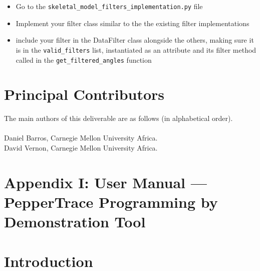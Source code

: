 \documentclass{CSSRforAfrica}
\newcommand{\blank}{~\\}
\begin{document}
\begin{itemize}[left=0em,  labelsep=1em, listparindent=1em] %
    \item Go to the \texttt{skeletal\_model\_filters\_implementation.py} file
    \item Implement your filter class similar to the the existing filter implementations
    \item include your filter in the DataFilter class alongside the others, making sure it is in the \texttt{valid\_filters} list, instantiated as an attribute and its filter method called in the \texttt{get\_filtered\_angles} function
\end{itemize}


\newpage




\pagebreak
\section*{Principal Contributors}
\label{contributors}
The main authors of this deliverable are as follows (in alphabetical order).
\blank
~
\blank
Daniel Barros, Carnegie Mellon University Africa.\\
David Vernon, Carnegie Mellon University Africa.\\    
 

\newpage

\section*{Appendix I: User Manual --- PepperTrace Programming by Demonstration Tool}

 
\section*{Introduction}
\label{introduction}
 
\end{document}
